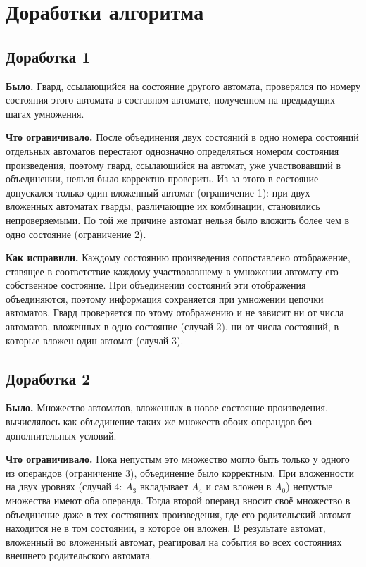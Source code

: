 \documentclass[12pt]{article}
\begin{document}
\section{Доработки алгоритма}
\label{sec:fixes}

\subsection*{Доработка 1}

\textbf{Было.} Гвард, ссылающийся на состояние другого автомата,
проверялся по номеру состояния этого автомата в составном автомате,
полученном на предыдущих шагах умножения.

\textbf{Что ограничивало.} После объединения двух состояний в одно номера
состояний отдельных автоматов перестают однозначно определяться номером
состояния произведения, поэтому гвард, ссылающийся на автомат, уже
участвовавший в объединении, нельзя было корректно проверить. Из-за этого в
состояние допускался только один вложенный автомат (ограничение 1): при
двух вложенных автоматах гварды, различающие их комбинации, становились
непроверяемыми. По той же причине автомат нельзя было вложить более чем в
одно состояние (ограничение 2).

\textbf{Как исправили.} Каждому состоянию произведения сопоставлено
отображение, ставящее в соответствие каждому участвовавшему в умножении
автомату его собственное состояние. При объединении состояний эти
отображения объединяются, поэтому информация сохраняется при умножении
цепочки автоматов. Гвард проверяется по этому отображению и не зависит ни
от числа автоматов, вложенных в одно состояние (случай 2), ни от числа
состояний, в которые вложен один автомат (случай 3).

\subsection*{Доработка 2}

\textbf{Было.} Множество автоматов, вложенных в новое состояние
произведения, вычислялось как объединение таких же множеств обоих
операндов без дополнительных условий.

\textbf{Что ограничивало.} Пока непустым это множество могло быть только у
одного из операндов (ограничение 3), объединение было корректным. При
вложенности на двух уровнях (случай 4: $A_3$ вкладывает $A_4$ и сам вложен
в $A_0$) непустые множества имеют оба операнда. Тогда второй операнд
вносит своё множество в объединение даже в тех состояниях произведения,
где его родительский автомат находится не в том состоянии, в которое он
вложен. В результате автомат, вложенный во вложенный автомат, реагировал
на события во всех состояниях внешнего родительского автомата.
\end{document}
